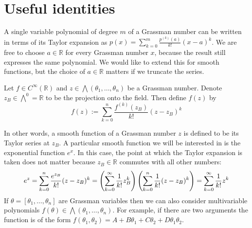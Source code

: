 \section{Useful identities} \label{section:berezin_identities}
A single variable polynomial of degree $m$ of a Grassman number can be written 
in terms of its Taylor expansion as 
$p(x) = \sum_{k=0}^{m} \frac{p^{(k)}(a)}{k!} (x-a)^k$.
We are free to choose $a\in\mathbb{R}$ for every Grassman number $x$, because the
result still expresses the same polynomial. We would like to extend this for
smooth functions, but the choice of $a\in\mathbb{R}$ matters if we truncate the
series. 
\begin{defn} \label{defn:grassman_function}
	Let $f\in C^\infty(\mathbb{R})$ and 
	$z \in \bigwedge(\theta_1,\ldots,\theta_n)$ be a Grassman number. 
	Denote $z_B \in \bigwedge^0 = \mathbb{R}$ to be the projection onto the 
	field. Then define $f(z)$ by
	\begin{equation}
	f(z) := \sum_{k=0}^{n} \frac{f^{(k)}(z_B)}{k!} (z-z_B)^k
	\end{equation}
\end{defn}
In other words, a smooth function of a Grassman number $z$ is defined to be its
Taylor series at $z_B$. A particular smooth function we will be interested in is
the exponential function $e^{x}$. In this case, the point at which the Taylor
expansion is taken does not matter because $z_B\in \mathbb{R}$ commutes with all
other numbers:
\begin{equation} \label{eq:grassman_exp}
e^{z}
=\sum_{k=0}^{n} \frac{e^{z_B}}{k!}(z-z_B)^k
= \paren{\sum_{k=0}^{\infty} \frac{1}{k!}z_B^k}\paren{\sum_{k=0}^{n} \frac{1}{k!}(z-z_B)^k}
= \sum_{k=0}^{\infty} \frac{1}{k!}z^k
\end{equation}
If $\theta=[\theta_1,\ldots,\theta_n]$ are Grassman variables then we can also
consider multivariable polynomials $f(\theta) \in
\bigwedge (\theta_1,\ldots,\theta_n)$. For example, if there are two arguments 
the function is of the form
$f(\theta_1,\theta_2)=A+B\theta_1+C\theta_2 + D\theta_1\theta_2$. 

